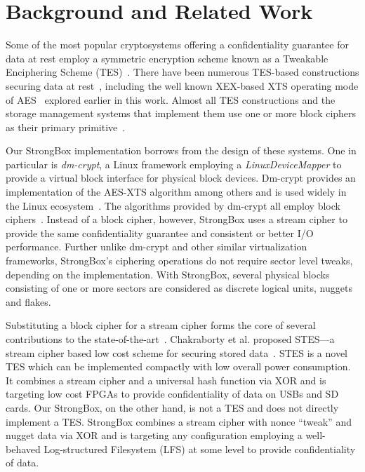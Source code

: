 \chapter{Background and Related Work} \label{chp:related}

Some of the most popular cryptosystems offering a confidentiality guarantee for
data at rest employ a symmetric encryption scheme known as a Tweakable
Enciphering Scheme (TES)~\cite{STES,XEX}. There have been numerous TES-based
constructions securing data at rest~\cite{STES,CMC,HCTR}, including the well
known XEX-based XTS operating mode of AES~\cite{XTS} explored earlier in this
work. Almost all TES constructions and the storage management systems that
implement them use one or more block ciphers as their primary
primitive~\cite{TES-From-Stream-Cipher,STES}.

Our StrongBox implementation borrows from the design of these systems. One in
particular is \emph{dm-crypt}, a Linux framework employing a
\textit{LinuxDeviceMapper} to provide a virtual block interface for physical
block devices. Dm-crypt provides an implementation of the AES-XTS algorithm
among others and is used widely in the Linux ecosystem~\cite{DmC-Android,
dmcrypt}. The algorithms provided by dm-crypt all employ block
ciphers~\cite{dmcrypt}. Instead of a block cipher, however, StrongBox uses a
stream cipher to provide the same confidentiality guarantee and consistent or
better I/O performance. Further unlike dm-crypt and other similar virtualization
frameworks, StrongBox's ciphering operations do not require sector level tweaks,
depending on the implementation. With StrongBox, several physical blocks
consisting of one or more sectors are considered as discrete logical units, \ie
nuggets and flakes.

Substituting a block cipher for a stream cipher forms the core of several
contributions to the state-of-the-art~\cite{STES, TES-From-Stream-Cipher}.
Chakraborty et al. proposed STES---a stream cipher based low cost scheme for
securing stored data~\cite{STES}. STES is a novel TES which can be implemented
compactly with low overall power consumption. It combines a stream cipher and a
universal hash function via XOR and is targeting low cost FPGAs to provide
confidentiality of data on USBs and SD cards. Our StrongBox, on the other hand,
is not a TES and does not directly implement a TES. StrongBox combines a stream
cipher with nonce ``tweak'' and nugget data via XOR and is targeting any
configuration employing a well-behaved Log-structured Filesystem (LFS) at some
level to provide confidentiality of data.

